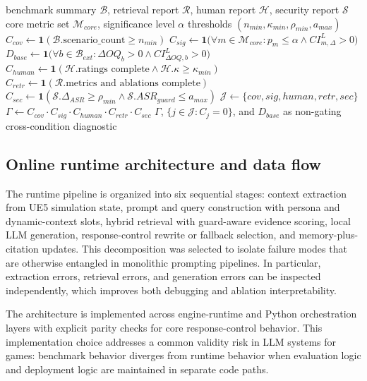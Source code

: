 ﻿\documentclass[a4paper,12pt]{article}
\newcommand{\ind}{\mathbf{1}}
\begin{document}
\begin{algorithm}[H]
\caption{Evidence-completeness gate evaluation}
\begin{algorithmic}[1]
\Require benchmark summary \(\mathcal{B}\), retrieval report \(\mathcal{R}\), human report \(\mathcal{H}\), security report \(\mathcal{S}\)
\Require core metric set \(\mathcal{M}_{core}\), significance level \(\alpha\)
\Require thresholds \((n_{min},\kappa_{min},\rho_{min},a_{max})\)
\State \(C_{cov}\gets \ind(\mathcal{B}.\text{scenario\_count}\ge n_{min})\)
\State \(C_{sig}\gets \ind\!\Big(\forall m\in\mathcal{M}_{core}: p_m\le\alpha \land CI_{m,\Delta}^{L}>0\Big)\)
\State \(D_{base}\gets \ind\!\Big(\forall b\in\mathcal{B}_{ext}: \Delta OQ_b>0 \land CI^{L}_{\Delta OQ,b}>0\Big)\) 
\State \(C_{human}\gets \ind(\mathcal{H}.\text{ratings complete} \land \mathcal{H}.\kappa\ge\kappa_{min})\)
\State \(C_{retr}\gets \ind(\mathcal{R}.\text{metrics and ablations complete})\)
\State \(C_{sec}\gets \ind(\mathcal{S}.\Delta_{ASR}\ge\rho_{min} \land \mathcal{S}.ASR_{guard}\le a_{max})\)
\State \(\mathcal{J}\gets\{cov,sig,human,retr,sec\}\)
\State \(\Gamma \gets C_{cov}\cdot C_{sig}\cdot C_{human}\cdot C_{retr}\cdot C_{sec}\)
\State \Return \(\Gamma\), \(\{j\in\mathcal{J}: C_j=0\}\), and \(D_{base}\) as non-gating cross-condition diagnostic
\end{algorithmic}
\end{algorithm}

\subsection{Online runtime architecture and data flow}

The runtime pipeline is organized into six sequential stages: context extraction from UE5 simulation state, prompt and query construction with persona and dynamic-context slots, hybrid retrieval with guard-aware evidence scoring, local LLM generation, response-control rewrite or fallback selection, and memory-plus-citation updates. This decomposition was selected to isolate failure modes that are otherwise entangled in monolithic prompting pipelines. In particular, extraction errors, retrieval errors, and generation errors can be inspected independently, which improves both debugging and ablation interpretability.

The architecture is implemented across engine-runtime and Python orchestration layers with explicit parity checks for core response-control behavior. This implementation choice addresses a common validity risk in LLM systems for games: benchmark behavior diverges from runtime behavior when evaluation logic and deployment logic are maintained in separate code paths.
\end{document}
